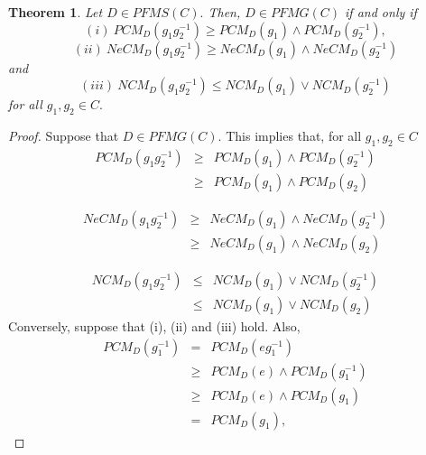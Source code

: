 \documentclass[12pt,letterpaper]{amsart}
\theoremstyle{plain}
\newtheorem{theorem}{Theorem}[section]
\theoremstyle{definition}
\numberwithin{equation}{section}
\begin{document}
\begin{theorem}
Let $D \in PFMS(C).$ Then, $D \in PFMG(C)$ if and only if $$(i)~PCM_{D}(g_1 g_2^{-1}) \geq PCM_{D}(g_1) \wedge PCM_{D}(g_2^{-1}),$$ $$(ii)~NeCM_{D}(g_1 g_2^{-1}) \geq NeCM_{D}(g_1) \wedge NeCM_{D}(g_2^{-1})$$ and $$(iii)~NCM_{D}(g_1 g_2^{-1}) \leq NCM_{D}(g_1) \vee NCM_{D}(g_2^{-1})$$ for all $g_1, g_2 \in C.$
\end{theorem}

\begin{proof}
Suppose that $D \in PFMG(C).$ This implies that, for all $g_1, g_2 \in C$
\begin{eqnarray*}
PCM_{D}(g_1 g_2^{-1}) & \geq & PCM_{D}(g_1) \wedge PCM_{D}(g_2^{-1}) \\
& \geq & PCM_{D}(g_1) \wedge PCM_{D}(g_2)
\end{eqnarray*}

\begin{eqnarray*}
NeCM_{D}(g_1 g_2^{-1}) & \geq & NeCM_{D}(g_1) \wedge NeCM_{D}(g_2^{-1}) \\
& \geq & NeCM_{D}(g_1) \wedge NeCM_{D}(g_2)
\end{eqnarray*}

\begin{eqnarray*}
NCM_{D}(g_1 g_2^{-1}) & \leq & NCM_{D}(g_1) \vee NCM_{D}(g_2^{-1}) \\
& \leq & NCM_{D}(g_1) \vee NCM_{D}(g_2)
\end{eqnarray*}
Conversely, suppose that (i), (ii) and (iii) hold. Also, 
\begin{eqnarray*}
PCM_{D}(g_1^{-1}) & = & PCM_{D}(e g_1^{-1})\\
& \geq & PCM_{D}(e) \wedge PCM_{D}(g_1^{-1}) \\
& \geq & PCM_{D}(e) \wedge PCM_{D}(g_1)\\
& = & PCM_{D}(g_1),
\end{eqnarray*}


\end{proof}
\end{document}
